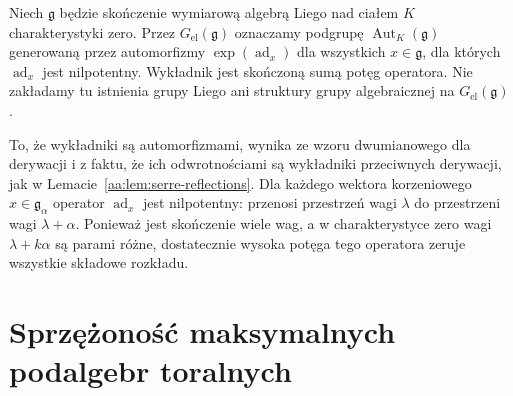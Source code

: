 \begin{definicja}
\label{aa:def:lie-elementary-inner}
Niech $\mathfrak g$ będzie skończenie wymiarową algebrą Liego nad ciałem $K$ charakterystyki zero. Przez $G_{\mathrm{el}}(\mathfrak g)$ oznaczamy podgrupę $\operatorname{Aut}_K(\mathfrak g)$ generowaną przez automorfizmy $\exp(\operatorname{ad}_x)$ dla wszystkich $x\in\mathfrak g$, dla których $\operatorname{ad}_x$ jest nilpotentny. Wykładnik jest skończoną sumą potęg operatora. Nie zakładamy tu istnienia grupy Liego ani struktury grupy algebraicznej na $G_{\mathrm{el}}(\mathfrak g)$.
\end{definicja}

To, że wykładniki są automorfizmami, wynika ze wzoru dwumianowego dla derywacji i z faktu, że ich odwrotnościami są wykładniki przeciwnych derywacji, jak w Lemacie~\ref{aa:lem:serre-reflections}. Dla każdego wektora korzeniowego $x\in\mathfrak g_\alpha$ operator $\operatorname{ad}_x$ jest nilpotentny: przenosi przestrzeń wagi $\lambda$ do przestrzeni wagi $\lambda+\alpha$. Ponieważ jest skończenie wiele wag, a w charakterystyce zero wagi $\lambda+k\alpha$ są parami różne, dostatecznie wysoka potęga tego operatora zeruje wszystkie składowe rozkładu.

\section{Sprzężoność maksymalnych podalgebr toralnych}


